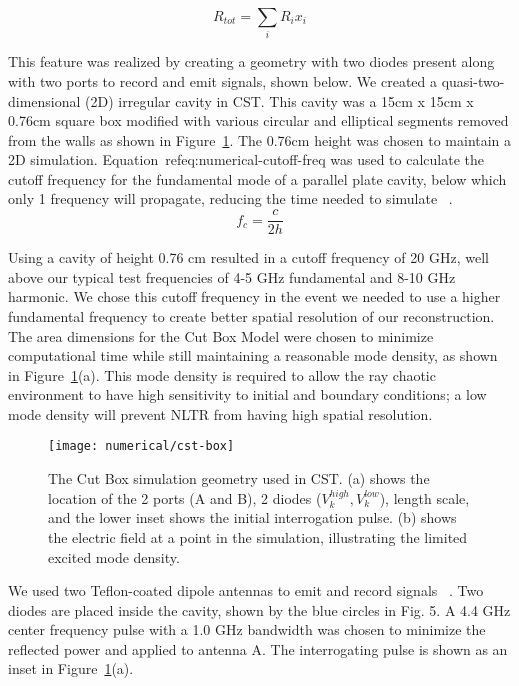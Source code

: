 \begin{equation}
R_{tot} = \sum_{i} R_{i}x_{i}
\label{eq:numerical-r-tot}
\end{equation}

This feature was realized by creating a geometry with two diodes present along with two ports to record and emit signals, shown below. We created a quasi-two-dimensional (2D) irregular cavity in CST. This cavity was a 15cm x 15cm x 0.76cm square box modified with various circular and elliptical segments removed from the walls as shown in Figure~\ref{fig:numerical-cst-box}.  The 0.76cm height was chosen to maintain a 2D simulation. Equation~ref{eq:numerical-cutoff-freq} was used to calculate the cutoff frequency for the fundamental mode of a parallel plate cavity, below which only 1 frequency will propagate, reducing the time needed to simulate ~\cite{griffiths_david_introduction_1999}.
\begin{equation}
f_c = \frac{c}{2h}
\label{eq:numerical-cutoff-freq}
\end{equation}

Using a cavity of height 0.76 cm resulted in a cutoff frequency of 20 GHz, well above our typical test frequencies of 4-5 GHz fundamental and 8-10 GHz harmonic. We chose this cutoff frequency in the event we needed to use a higher fundamental frequency to create better spatial resolution of our reconstruction. The area dimensions for the Cut Box Model were chosen to minimize computational time while still maintaining a reasonable mode density, as shown in Figure~\ref{fig:numerical-cst-box}(a). This mode density is required to allow the ray chaotic environment to have high sensitivity to initial and boundary conditions; a low mode density will prevent NLTR from having high spatial resolution.

\begin{figure}[t]
\centering
\texttt{[image: numerical/cst-box]}
\caption[The Cut Box Model]{The Cut Box simulation geometry used in CST. (a) shows the location of the 2 ports (A and B), 2 diodes ($V_k^{high}, V_k^{low}$), length scale, and the lower inset shows the initial interrogation pulse. (b) shows the electric field at a point in the simulation, illustrating the limited excited mode density.}
\label{fig:numerical-cst-box}
\end{figure}

We used two Teflon-coated dipole antennas to emit and record signals ~\cite{hemmady2006universal}. Two diodes are placed inside the cavity, shown by the blue circles in Fig. 5. A 4.4 GHz center frequency pulse with a 1.0 GHz bandwidth was chosen to minimize the reflected power and applied to antenna A. The interrogating pulse is shown as an inset in Figure~\ref{fig:numerical-cst-box}(a).

